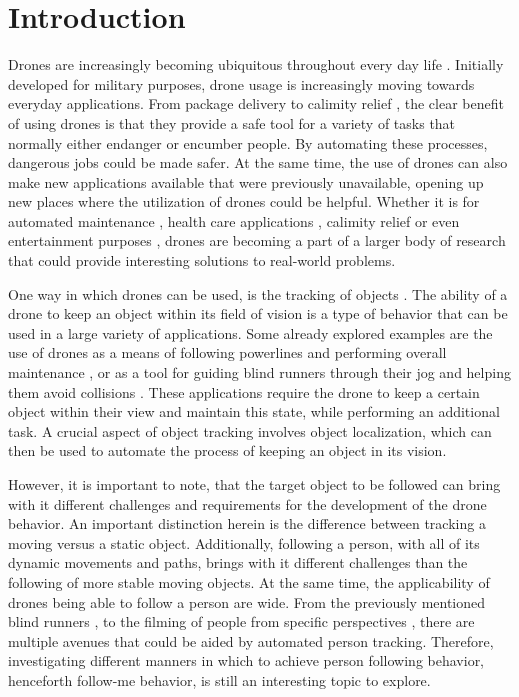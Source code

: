 \section{Introduction}
Drones are increasingly becoming ubiquitous throughout every day life \cite{riseofdrones}. 
Initially developed for military purposes, drone usage is increasingly moving towards everyday 
applications. From package delivery to calimity relief \cite{application2forestfires}, 
the clear benefit of using drones is that they provide a safe tool for a variety of tasks 
that normally either endanger or encumber people. By automating these processes, dangerous 
jobs could be made safer. At the same time, the use of drones can also make new applications 
available that were previously unavailable, opening up new places where the utilization of 
drones could be helpful. Whether it is for automated maintenance \cite{PowerlineFollower}, 
health care applications \cite{blindrunnersdrone,application1cardiac}, 
calimity relief \cite{application2forestfires} or even entertainment purposes \cite{application3sports}, 
drones are becoming a part of a larger body of research that could provide interesting solutions 
to real-world problems. 

One way in which drones can be used, is the tracking of objects \cite{ParrotARDrone}. 
The ability of a drone to keep an object within its field of vision is a type of 
behavior that can be used in a large variety of applications. Some already explored examples 
are the use of drones as a means of following powerlines and performing overall 
maintenance \cite{PowerlineFollower}, or as a tool for guiding blind runners through 
their jog and helping them avoid collisions \cite{blindrunnersdrone}. These applications 
require the drone to keep a certain object within their view and maintain this state, 
while performing an additional task. A crucial aspect of object tracking involves 
object localization, which can then be used to automate the process of keeping an 
object in its vision. 

However, it is important to note, that the target object to be followed can bring with it 
different challenges and requirements for the development of the drone behavior. An 
important distinction herein is the difference between tracking a moving versus a static object. 
Additionally, following a person, with all of its dynamic movements and paths, brings with it 
different challenges than the following of more stable moving objects. 
At the same time, the applicability of drones being able to follow a person are wide. From the 
previously mentioned blind runners \cite{blindrunnersdrone}, to the filming of people from 
specific perspectives \cite{FrontalViewRL}, there are multiple avenues that could be aided 
by automated person tracking. Therefore, investigating different manners in which to achieve 
person following behavior, henceforth follow-me behavior, is still an interesting topic to 
explore.

